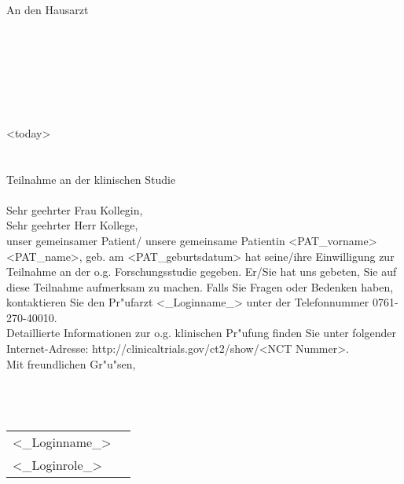 \documentclass{scrreprt}
\begin{document}
\baselineskip15pt
\setlength{\headheight}{7\baselineskip}
\setlength{\oddsidemargin}{-3mm} 
\addtolength{\textwidth}{2cm}

\noindent An den Hausarzt\\
\noindent \\
\noindent \\
\noindent \\
\\ \\ 
\\ \\ 

\hspace{12.5cm} <today>\\ \\ \\ 

\noindent Teilnahme an der klinischen Studie {\it <Voller Titel>}\\ \\

\noindent  Sehr geehrter Frau Kollegin,\\
\noindent  Sehr geehrter Herr Kollege,\\

\noindent unser gemeinsamer Patient/ unsere gemeinsame Patientin <PAT_vorname> <PAT_name>, geb. am <PAT_geburtsdatum> hat seine/ihre Einwilligung zur Teilnahme an der o.g. Forschungsstudie gegeben. Er/Sie hat uns gebeten, Sie auf diese Teilnahme aufmerksam zu machen. Falls Sie Fragen oder Bedenken haben, kontaktieren Sie den Pr"ufarzt <_Loginname_> unter der Telefonnummer 0761-270-40010.\\

\noindent Detaillierte Informationen zur o.g. klinischen Pr"ufung finden Sie unter folgender Internet-Adresse: http://clinicaltrials.gov/ct2/show/<NCT Nummer>.\\

\noindent Mit freundlichen Gr"u"sen, \\ \\   \\ \\

\hspace*{-7mm}  \begin{tabularx}{20cm}{XX}
<_Loginname_>\\ 
<_Loginrole_> \\ 
\end{tabularx}
\end{document}
